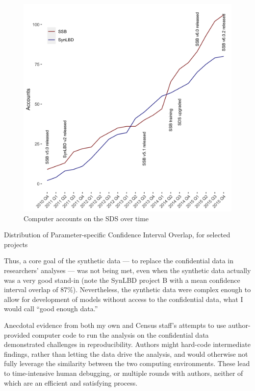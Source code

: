 \documentclass[]{hdsr}
\begin{document}
\begin{figure}
    \centering
    \includegraphics[width=\textwidth]{figs/accounts-2015.png}
    \caption{Computer accounts on the SDS over time}
    \label{fig:growth_in_sds}
\end{figure}

\begin{table}[]
    \centering
    
    
    \caption{Distribution of Parameter-specific Confidence Interval Overlap, for selected projects}
    \label{tab:overlap}
\end{table}

Thus, a core goal of the synthetic data --- to replace the confidential data in researchers' analyses --- was not being met, even when the synthetic data actually was a very good stand-in (note the SynLBD project B with a mean confidence interval overlap of 87\%). Nevertheless, the synthetic data were complex enough to allow for development of models without access to the confidential data, what I would call ``good enough data.''

Anecdotal evidence from both my own and Census staff's attempts to use author-provided computer code to run the analysis on the confidential data demonstrated challenges in reproducibility. Authors might hard-code intermediate findings, rather than letting the data drive the analysis, and would otherwise not fully leverage the similarity between the two computing environments. These lead to time-intensive human debugging, or multiple rounds with authors, neither of which are an efficient and satisfying process. 
\end{document}
